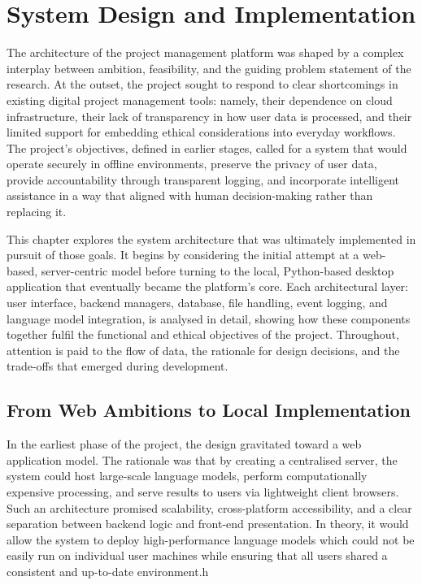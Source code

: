 \documentclass{report}
\begin{document}
\chapter{System Design and Implementation}

The architecture of the project management platform was shaped by a complex interplay between ambition, feasibility, and the guiding problem statement of the research. At the outset, the project sought to respond to clear shortcomings in existing digital project management tools: namely, their dependence on cloud infrastructure, their lack of transparency in how user data is processed, and their limited support for embedding ethical considerations into everyday workflows. The project’s objectives, defined in earlier stages, called for a system that would operate securely in offline environments, preserve the privacy of user data, provide accountability through transparent logging, and incorporate intelligent assistance in a way that aligned with human decision-making rather than replacing it.

This chapter explores the system architecture that was ultimately implemented in pursuit of those goals. It begins by considering the initial attempt at a web-based, server-centric model before turning to the local, Python-based desktop application that eventually became the platform’s core. Each architectural layer: user interface, backend managers, database, file handling, event logging, and language model integration, is analysed in detail, showing how these components together fulfil the functional and ethical objectives of the project. Throughout, attention is paid to the flow of data, the rationale for design decisions, and the trade-offs that emerged during development.

\section{From Web Ambitions to Local Implementation}

In the earliest phase of the project, the design gravitated toward a web application model. The rationale was that by creating a centralised server, the system could host large-scale language models, perform computationally expensive processing, and serve results to users via lightweight client browsers. Such an architecture promised scalability, cross-platform accessibility, and a clear separation between backend logic and front-end presentation. In theory, it would allow the system to deploy high-performance language models which could not be easily run on individual user machines while ensuring that all users shared a consistent and up-to-date environment.h
\end{document}
